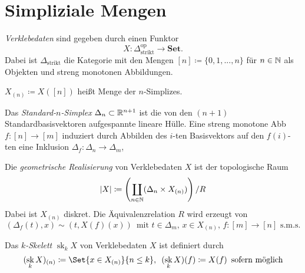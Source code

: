 \documentclass{cheat-sheet}
\newcommand{\SetC}{\mathbf{Set}} %
\newcommand{\op}{\mathrm{op}} %
\DeclareMathOperator{\sk}{sk} %
\begin{document}


\section{Simpliziale Mengen}


\begin{defn}
  \emph{Verklebedaten} sind gegeben durch einen Funktor
  \[ X : \Delta_{\text{strikt}}^\op \to \SetC. \]
  Dabei ist $\Delta_{\text{strikt}}$ die Kategorie mit den Mengen
  $[n] \coloneqq \{ 0, 1, ..., n \}$ für $n \in \mathbb{N}$ als Objekten und streng monotonen Abbildungen.
\end{defn}

\begin{nota}
  $X_{(n)} \coloneqq X([n])$ heißt Menge der $n$-Simplizes.
\end{nota}

\begin{defn}
  Das \emph{Standard-$n$-Simplex} $\Delta_n \subset \mathbb{R}^{n+1}$ ist die von den $(n{+}1)$ Standardbasisvektoren aufgespannte lineare Hülle. Eine streng monotone Abb $f : [n] \to [m]$ induziert durch Abbilden des $i$-ten Basisvektors auf den $f(i)$-ten eine Inklusion $\Delta_f : \Delta_n \to \Delta_m$, 
\end{defn}

\begin{defn}
  Die \emph{geometrische Realisierung} von Verklebedaten $X$ ist der topologische Raum
  \[ \lvert X\rvert \coloneqq \left( \coprod_{n \in \mathbb{N}} (\Delta_n \times X_{(n)}) \right) / R \]
  Dabei ist $X_{(n)}$ diskret. Die Äquivalenzrelation $R$ wird erzeugt von
  \[
    (\Delta_f(t), x) \sim (t, X(f)(x)) \enspace
    \text{mit $t \in \Delta_m$, $x \in X_{(n)}$, $f : [m] {\to} [n]$ s.m.s.}
  \]
\end{defn}


\begin{defn}
  Das \emph{$k$-Skelett} $\sk_k X$ von Verklebedaten $X$ ist definiert durch
  \[
    (\sk_k X)_{(n)} \coloneqq
    \Set{ x \in X_{(n)} }{ n \leq k }, \enspace
    (\sk_k X)(f) \coloneqq X(f) \enspace \text{sofern möglich}
  \]
\end{defn}
\end{document}
